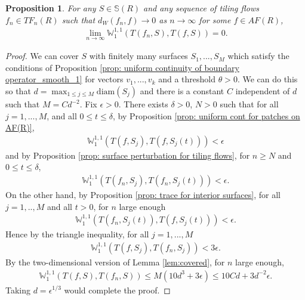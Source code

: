 \documentclass[11pt]{article}
\newtheorem{prop}[thm]{Proposition}
\theoremstyle{remark}
\theoremstyle{definition}
\newcommand{\m}[1]{\mathbb{#1}}
\begin{document}
\begin{prop}\label{prop: continuity of tiling flow boundary}
    For any $S\in \m S(R)$ and any sequence of tiling flows $f_n \in TF_n(R)$ such that $d_W(f_n,f)\to 0$ as $n\to \infty$ for some $f\in AF(R)$, 
    \begin{align*}
        \lim_{n\to \infty} \m W_1^{1,1}(T(f_n,S), T(f,S))= 0.
    \end{align*}
\end{prop}
\begin{proof}
    We can cover $S$ with finitely many surfaces $S_1,...,S_M$ which satisfy the conditions of Proposition \ref{prop: uniform continuity of boundary operator_smooth_1} for vectors $v_1,...,v_k$ and a threshold $\theta>0$. We can do this so that $d = \max_{1\leq j\leq M} \text{diam}(S_j)$ and there is a constant $C$ independent of $d$ such that $M = C d^{-2}$. Fix $\epsilon>0$. There exists $\delta>0$, $N>0$ such that for all $j=1,...,M$, and all $0\leq t\leq \delta$, by Proposition \ref{prop: uniform cont for patches on AF(R)}, 
    \begin{align*}
        \m W_{1}^{1,1}(T(f,S_j), T(f,S_j(t))) < \epsilon 
    \end{align*}
    and by Proposition \ref{prop: surface perturbation for tiling flows}, for $n\geq N$ and $0\leq t\leq \delta$,
    \begin{align*}
        \m W_{1}^{1,1}(T(f_n,S_j), T(f_n,S_j(t))) < \epsilon. 
    \end{align*}
    On the other hand, by Proposition \ref{prop: trace for interior surfaces}, for all $j=1,..,M$ and all $t>0$, for $n$ large enough
    \begin{align*}
        \m W_{1}^{1,1}(T(f_n,S_j(t)),T(f,S_j(t)))< \epsilon.
    \end{align*}
    Hence by the triangle inequality, for all $j=1,...,M$
    \begin{align*}
        \m W_{1}^{1,1}(T(f,S_j), T(f_n,S_j)) < 3\epsilon.
    \end{align*}
    By the two-dimensional version of Lemma \ref{lem:covered}, for $n$ large enough, 
    \begin{align*}
        \m W_{1}^{1,1}(T(f,S), T(f_n,S))\leq M (10 d^3 + 3 \epsilon) \leq 10 C d + 3 d^{-2} \epsilon.
    \end{align*}
    Taking $d = \epsilon^{1/3}$ would complete the proof.
\end{proof}
\end{document}
